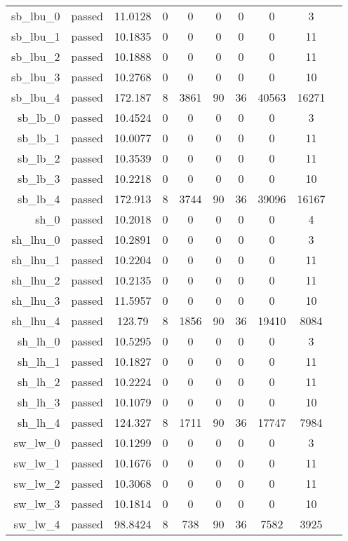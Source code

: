 \begin{longtable}{r|ccccccccc}
    sb\_lbu\_0 & passed & 11.0128 & 0 & 0 & 0 & 0 & 0 & 3 \\
    sb\_lbu\_1 & passed & 10.1835 & 0 & 0 & 0 & 0 & 0 & 11 \\
    sb\_lbu\_2 & passed & 10.1888 & 0 & 0 & 0 & 0 & 0 & 11 \\
    sb\_lbu\_3 & passed & 10.2768 & 0 & 0 & 0 & 0 & 0 & 10 \\
    sb\_lbu\_4 & passed & 172.187 & 8 & 3861 & 90 & 36 & 40563 & 16271 \\
    sb\_lb\_0 & passed & 10.4524 & 0 & 0 & 0 & 0 & 0 & 3 \\
    sb\_lb\_1 & passed & 10.0077 & 0 & 0 & 0 & 0 & 0 & 11 \\
    sb\_lb\_2 & passed & 10.3539 & 0 & 0 & 0 & 0 & 0 & 11 \\
    sb\_lb\_3 & passed & 10.2218 & 0 & 0 & 0 & 0 & 0 & 10 \\
    sb\_lb\_4 & passed & 172.913 & 8 & 3744 & 90 & 36 & 39096 & 16167 \\
    sh\_0 & passed & 10.2018 & 0 & 0 & 0 & 0 & 0 & 4 \\
    sh\_lhu\_0 & passed & 10.2891 & 0 & 0 & 0 & 0 & 0 & 3 \\
    sh\_lhu\_1 & passed & 10.2204 & 0 & 0 & 0 & 0 & 0 & 11 \\
    sh\_lhu\_2 & passed & 10.2135 & 0 & 0 & 0 & 0 & 0 & 11 \\
    sh\_lhu\_3 & passed & 11.5957 & 0 & 0 & 0 & 0 & 0 & 10 \\
    sh\_lhu\_4 & passed & 123.79 & 8 & 1856 & 90 & 36 & 19410 & 8084 \\
    sh\_lh\_0 & passed & 10.5295 & 0 & 0 & 0 & 0 & 0 & 3 \\
    sh\_lh\_1 & passed & 10.1827 & 0 & 0 & 0 & 0 & 0 & 11 \\
    sh\_lh\_2 & passed & 10.2224 & 0 & 0 & 0 & 0 & 0 & 11 \\
    sh\_lh\_3 & passed & 10.1079 & 0 & 0 & 0 & 0 & 0 & 10 \\
    sh\_lh\_4 & passed & 124.327 & 8 & 1711 & 90 & 36 & 17747 & 7984 \\
    sw\_lw\_0 & passed & 10.1299 & 0 & 0 & 0 & 0 & 0 & 3 \\
    sw\_lw\_1 & passed & 10.1676 & 0 & 0 & 0 & 0 & 0 & 11 \\
    sw\_lw\_2 & passed & 10.3068 & 0 & 0 & 0 & 0 & 0 & 11 \\
    sw\_lw\_3 & passed & 10.1814 & 0 & 0 & 0 & 0 & 0 & 10 \\
    sw\_lw\_4 & passed & 98.8424 & 8 & 738 & 90 & 36 & 7582 & 3925 \\

\end{longtable}
